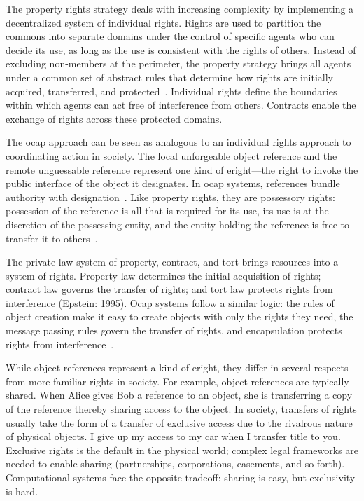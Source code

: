 \documentclass{llncs}
\begin{document}
The property rights strategy deals with increasing complexity by implementing a decentralized system of individual rights. Rights are used to partition the commons into separate domains under the control of specific agents who can decide its use, as long as the use is consistent with the rights of others. Instead of excluding non-members at the perimeter, the property strategy brings all agents under a common set of abstract rules that determine how rights are initially acquired, transferred, and protected~\cite{hayek_law_1973}. Individual rights define the boundaries within which agents can act free of interference from others. Contracts enable the exchange of rights across these protected domains.  

The ocap approach can be seen as analogous to an individual rights approach to coordinating action in society. The local unforgeable object reference and the remote unguessable reference represent one kind of eright---the right to invoke the public interface of the object it designates. In ocap systems, references bundle authority with designation~\cite{Hardy88Deputy}. Like property rights, they are possessory rights: possession of the reference is all that is required for its use, its use is at the discretion of the possessing entity, and the entity holding the reference is free to transfer it to others~\cite{mossoff_what_2003}.

The private law system of property, contract, and tort brings resources into a system of rights. Property law determines the initial acquisition of rights; contract law governs the transfer of rights; and tort law protects rights from interference (Epstein: 1995). Ocap systems follow a similar logic: the rules of object creation make it easy to create objects with only the rights they need, the message passing rules govern the transfer of rights, and encapsulation protects rights from interference~\cite{RobustComposition}.

While object references represent a kind of eright, they differ in several respects from more familiar rights in society. For example, object references are typically shared. When Alice gives Bob a reference to an object, she is transferring a copy of the reference thereby sharing access to the object. In society, transfers of rights usually take the form of a transfer of exclusive access due to the rivalrous nature of physical objects. I give up my access to my car when I transfer title to you. Exclusive rights is the default in the physical world; complex legal frameworks are needed to enable sharing (partnerships, corporations, easements, and so forth). Computational systems face the opposite tradeoff: sharing is easy, but exclusivity is hard.
\end{document}
